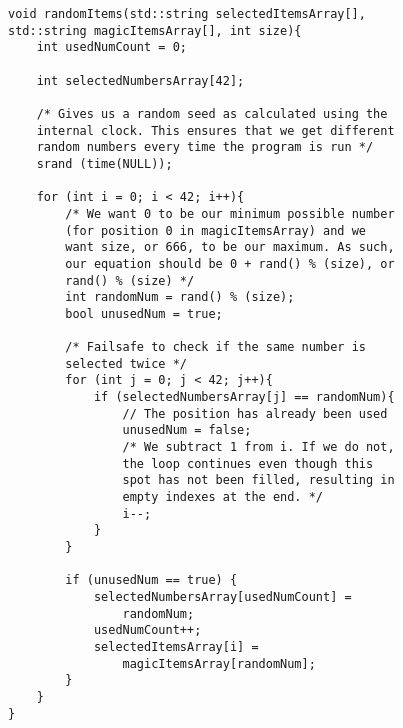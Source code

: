 \documentclass{article}
\begin{document}
\begin{lstlisting}
void randomItems(std::string selectedItemsArray[], 
std::string magicItemsArray[], int size){
    int usedNumCount = 0;

    int selectedNumbersArray[42];

    /* Gives us a random seed as calculated using the 
    internal clock. This ensures that we get different 
    random numbers every time the program is run */
    srand (time(NULL));

    for (int i = 0; i < 42; i++){
        /* We want 0 to be our minimum possible number 
        (for position 0 in magicItemsArray) and we 
        want size, or 666, to be our maximum. As such, 
        our equation should be 0 + rand() % (size), or 
        rand() % (size) */
        int randomNum = rand() % (size);
        bool unusedNum = true;

        /* Failsafe to check if the same number is 
        selected twice */
        for (int j = 0; j < 42; j++){
            if (selectedNumbersArray[j] == randomNum){
                // The position has already been used
                unusedNum = false;
                /* We subtract 1 from i. If we do not, 
                the loop continues even though this 
                spot has not been filled, resulting in 
                empty indexes at the end. */
                i--;
            }
        }

        if (unusedNum == true) {
            selectedNumbersArray[usedNumCount] = 
                randomNum;
            usedNumCount++;
            selectedItemsArray[i] = 
                magicItemsArray[randomNum];
        }
    }
}
\end{lstlisting}
\end{document}
